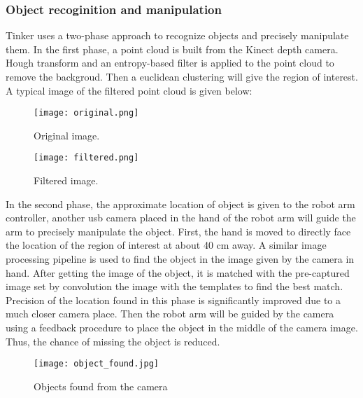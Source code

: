\subsubsection{Object recoginition and manipulation}
Tinker uses a two-phase approach to recognize objects and precisely manipulate them. In the first phase, a point cloud is built from the Kinect depth camera. Hough transform and an entropy-based filter is applied to the point cloud to remove the backgroud. Then a euclidean clustering will give the region of interest. A typical image of the filtered point cloud is given below:
\begin{figure}[H]
	\centering
    \texttt{[image: original.png]}
    \caption{Original image.}
\end{figure}

\begin{figure}[H]
	\centering
    \texttt{[image: filtered.png]}
    \caption{Filtered image.}
\end{figure}

In the second phase, the approximate location of object is given to the robot arm controller, another usb camera placed in the hand of the robot arm will guide the arm to precisely manipulate the object. First, the hand is moved to directly face the location of the region of interest at about 40 cm away. A similar image processing pipeline is used to find the object in the image given by the camera in hand. After getting the image of the object, it is matched with the pre-captured image set by convolution the image with the templates to find the best match. Precision of the location found in this phase is significantly improved due to a much closer camera place. Then the robot arm will be guided by the camera using a feedback procedure to place the object in the middle of the camera image. Thus, the chance of missing the object is reduced.

\begin{figure}[!t]
	\centering
    \texttt{[image: object\_found.jpg]}
    \caption{Objects found from the camera}
\end{figure}

